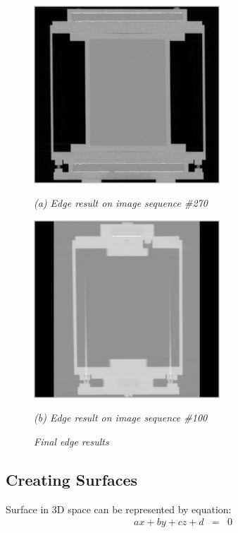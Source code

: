 \begin{figure}[htb]
  \begin{minipage}[t]{2.75in}
    \centering
    \centerline{\mbox{\includegraphics[width=2.75in]{data_extraction/images/sample/20121017_270/Coronal/result.eps}}}
    \centerline{\emph{(a) Edge result on image sequence \#270}}
  \end{minipage}
  \begin{minipage}[t]{2.75in}
    \centering
    \centerline{\mbox{\includegraphics[width=2.75in]{data_extraction/images/sample/20121017_100/Coronal/result_canny_[0-001,0-002].eps}}}
    \centerline{\emph{(b) Edge result on image sequence \#100}}
  \end{minipage}
  \caption{\emph{Final edge results}}
  \label{fig:coronal_edge_final_result}
\end{figure}


\subsection{Creating Surfaces}

Surface in 3D space can be represented by equation:
\begin{eqnarray}
ax + by + cz + d & = & 0 \label{eq:plane}
\end{eqnarray}

